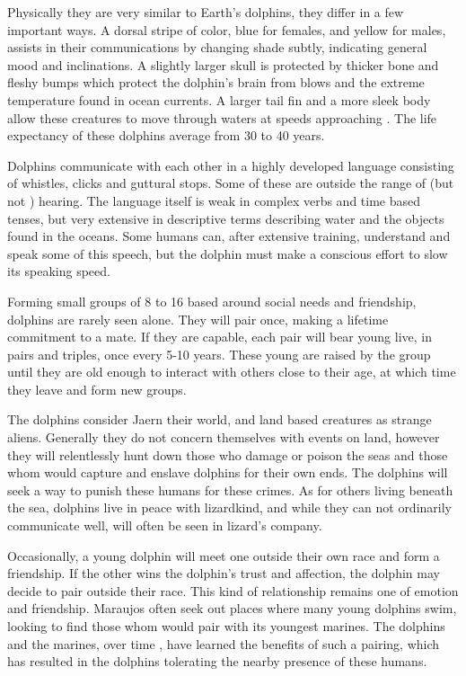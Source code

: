 \begin{multicols*}{2}
Physically they are very similar to Earth's dolphins, they differ in a few important ways. A dorsal stripe of color, blue for females, and yellow for males, assists in their communications by changing shade subtly, indicating general mood and inclinations. A slightly larger skull is protected by thicker bone and fleshy bumps which protect the dolphin's brain from blows and the extreme temperature found in ocean currents. A larger tail fin and a more sleek body allow these creatures to move through waters at speeds approaching . The life expectancy of these dolphins average from 30 to 40 years.

Dolphins communicate with each other in a highly developed language consisting of whistles, clicks and guttural stops. Some of these are outside the range of  (but not ) hearing. The language itself is weak in complex verbs and time based tenses, but very extensive in descriptive terms describing water and the objects found in the oceans. Some humans can, after extensive training, understand and speak some of this speech, but the dolphin must make a conscious effort to slow its speaking speed.

Forming small groups of 8 to 16 based around social needs and friendship, dolphins are rarely seen alone. They will pair once, making a lifetime commitment to a mate. If they are capable, each pair will bear young live, in pairs and triples, once every 5-10 years. These young are raised by the group until they are old enough to interact with others close to their age, at which time they leave and form new groups.

The dolphins consider Jaern their world, and land based creatures as strange aliens. Generally they do not concern themselves with events on land, however they will relentlessly hunt down those who damage or poison the seas and those whom would capture and enslave dolphins for their own ends. The dolphins will seek a way to punish these humans for these crimes. As for others living beneath the sea, dolphins live in peace with lizardkind, and while they can not ordinarily communicate well, will often be seen in lizard’s company.

Occasionally, a young dolphin will meet one outside their own race and form a friendship. If the other wins the dolphin’s trust and affection, the dolphin may decide to pair outside their race. This kind of relationship remains one of emotion and friendship. Maraujos often seek out places where many young dolphins swim, looking to find those whom would pair with its youngest marines. The dolphins and the marines, over time , have learned the benefits of such a pairing, which has resulted in the dolphins tolerating the nearby presence of these humans.


\end{multicols*}
